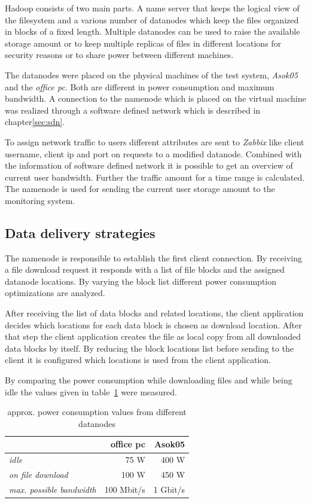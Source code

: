 Hadoop consists of two main parts. A name server that keeps the logical view of the filesystem and a various number of datanodes which keep the files organized in blocks of a fixed length. Multiple datanodes can be used to raise the available storage amount or to keep multiple replicas of files in different locations for security reasons or to share power between different machines. 

The datanodes were placed on the physical machines of the test system, \textit{Asok05} and the \textit{office pc}. Both are different in power consumption and maximum bandwidth. A connection to the namenode which is placed on the virtual machine was realized through a software defined network which is described in chapter\ref{sec:sdn}.

To assign network traffic to users different attributes are sent to \textit{Zabbix} like client username, client ip and port on requests to a modified datanode. Combined with the information of software defined network it is possible to get an overview of current user bandwidth. Further the traffic amount for a time range is calculated. The namenode is used for sending the current user storage amount to the monitoring system.

\subsection{Data delivery strategies}

The namenode is responsible to establish the first client connection. By receiving a file download request it responds with a list of file blocks and the assigned datanode locations. By varying the block list different power consumption optimizations are analyzed.

After receiving the list of data blocks and related locations, the client application decides which locations for each data block is chosen as download location. After that step the client application creates the file as local copy from all downloaded data blocks by itself. By reducing the block locations list before sending to the client it is configured which locations is used from the client application.

By comparing the power consumption while downloading files and while being idle the values given in table~\ref{tab:powerconsumptionvalues} were measured.

\begin{table}
	\centering
	\caption{approx. power consumption values from different datanodes}	
	\begin{tabular}{|l|r|r|}
		\hline \rule[-2ex]{0pt}{5.5ex}  & \textbf{office pc} & \textbf{Asok05} \\ 
		\hline \rule[-2ex]{0pt}{5.5ex} \textit{idle} &   75 W &   400 W \\ 
		\hline \rule[-2ex]{0pt}{5.5ex} \textit{on file download} & 100 W &  450 W \\ 
		\hline \rule[-2ex]{0pt}{5.5ex} \textit{max. possible bandwidth} & 100 Mbit/s & 1 Gbit/s \\
		\hline
	\end{tabular} 
	\label{tab:powerconsumptionvalues}
\end{table}

